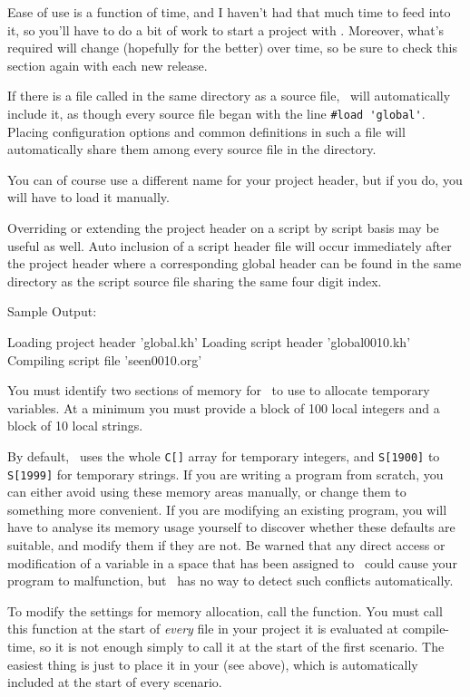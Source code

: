     

Ease of use is a function of time, and I haven't had that much time to feed into 
it, so you'll have to do a bit of work to start a project with \package. 
Moreover, what's required will change (hopefully for the better) over time, so 
be sure to check this section again with each new release.


  If there is a file called  in the same directory as a source
  file, \compiler\ will automatically include it, as though every source file
  began with the line \lstinline|#load 'global'|.  Placing configuration
  options and common definitions in such a file will automatically share them
  among every source file in the directory.
  
  You can of course use a different name for your project header, but if you do,
  you will have to load it manually.
  
  Overriding or extending the project header on a script by script basis may be
  useful as well.  Auto inclusion of a script header file will occur immediately
  after the project header where a corresponding global header 
  can be found in the same directory as the script source file sharing the same
  four digit index.
  
  Sample Output:
  
    Loading project header 'global.kh'
    Loading script header 'global0010.kh'
    Compiling script file 'seen0010.org'
  

\label{sec:allocation}

  You must identify two sections of memory for \compiler\ to use to allocate 
  temporary variables.  At a minimum you must provide a block of 100 local 
  integers and a block of 10 local strings.
  
  By default, \compiler\ uses the whole \lstinline|C[]| array for temporary 
  integers, and \lstinline|S[1900]| to \lstinline|S[1999]| for temporary 
  strings.  If you are writing a program from scratch, you can either avoid 
  using these memory areas manually, or change them to something more 
  convenient.  If you are modifying an existing program, you will have to 
  analyse its memory usage yourself to discover whether these defaults are 
  suitable, and modify them if they are not.  Be warned that any direct access 
  or modification of a variable in a space that has been assigned to \compiler\ 
  could cause your program to malfunction, but \compiler\ has no way to detect 
  such conflicts automatically.
  
  To modify the settings for memory allocation, call the 
   function.  You must call this function at the start 
  of \emph{every} file in your project\,\textemdash\,it is evaluated at 
  compile-time, so it is not enough simply to call it at the start of the first 
  scenario.  The easiest thing is just to place it in your \file{global.kh} (see 
  above), which is automatically included at the start of every scenario.
